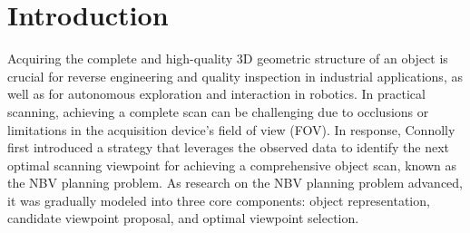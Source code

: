 \section{Introduction}
\label{sec:intro}

{A}{cquiring} the complete and high-quality 3D geometric structure of an object is crucial for reverse engineering and quality inspection in industrial applications, as well as for autonomous exploration and interaction in robotics.
In practical scanning, achieving a complete scan can be challenging due to occlusions or limitations in the acquisition device's field of view (FOV).
In response, Connolly \cite{connolly1985determination} first introduced a strategy that leverages the observed data to identify the next optimal scanning viewpoint for achieving a comprehensive object scan, known as the NBV planning problem.
As research on the NBV planning problem advanced, it was gradually modeled into three core components: object representation, candidate viewpoint proposal, and optimal viewpoint selection.

